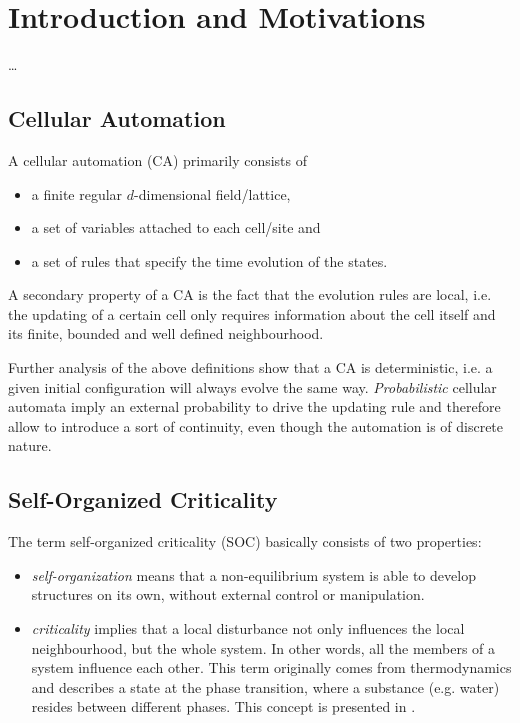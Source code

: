\chapter{Introduction and Motivations}
\thispagestyle{fancy}


\ldots

\section{Cellular Automation}
A cellular automation (CA) primarily consists of
\begin{itemize}
\item a finite regular $d$-dimensional field/lattice,
\item a set of variables attached to each cell/site and
\item a set of rules that specify the time evolution of the states.
\end{itemize}
A secondary property of a CA is the fact that the evolution rules are local, i.e. the updating of a certain cell only requires information about the cell itself and its finite, bounded and well defined neighbourhood.

Further analysis of the above definitions show that a CA is deterministic, i.e. a given initial configuration will always evolve the same way. \emph{Probabilistic} cellular automata imply an external probability to drive the updating rule and therefore allow to introduce a sort of continuity, even though the automation is of discrete nature.

\section{Self-Organized Criticality}
The term self-organized criticality (SOC) basically consists of two properties:
\begin{itemize}
\item \emph{self-organization} means that a non-equilibrium system is able to develop structures on its own, without external control or manipulation.
\item \emph{criticality} implies that a local disturbance not only influences the local neighbourhood, but the whole system. In other words, all the members of a system influence each other. This term originally comes from thermodynamics and describes a state at the phase transition, where a substance (e.g. water) resides between different phases. This concept is presented in \cite{1overf}.
\end{itemize}

